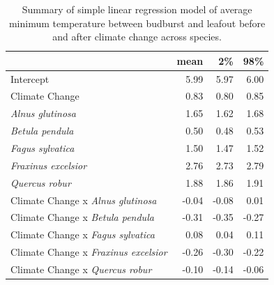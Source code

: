 \documentclass{article}\usepackage[]{graphicx}\usepackage[]{color}
\begin{document}
\begin{table}[H]
\centering
\caption{Summary of simple linear regression model of average minimum temperature between budburst and leafout before and after climate change across species.} 
\label{tab:simptmin}
\begin{tabular}{lrrr}
  \hline
 & mean & 2\% & 98\% \\ 
  \hline
Intercept & 5.99 & 5.97 & 6.00 \\ 
  Climate Change & 0.83 & 0.80 & 0.85 \\ 
  \textit{Alnus glutinosa} & 1.65 & 1.62 & 1.68 \\ 
  \textit{Betula pendula} & 0.50 & 0.48 & 0.53 \\ 
  \textit{Fagus sylvatica} & 1.50 & 1.47 & 1.52 \\ 
  \textit{Fraxinus excelsior} & 2.76 & 2.73 & 2.79 \\ 
  \textit{Quercus robur} & 1.88 & 1.86 & 1.91 \\ 
  Climate Change x \textit{Alnus glutinosa} & -0.04 & -0.08 & 0.01 \\ 
  Climate Change x \textit{Betula pendula} & -0.31 & -0.35 & -0.27 \\ 
  Climate Change x \textit{Fagus sylvatica} & 0.08 & 0.04 & 0.11 \\ 
  Climate Change x \textit{Fraxinus excelsior} & -0.26 & -0.30 & -0.22 \\ 
  Climate Change x \textit{Quercus robur} & -0.10 & -0.14 & -0.06 \\ 
   \hline
\end{tabular}
\end{table}
\end{document}
